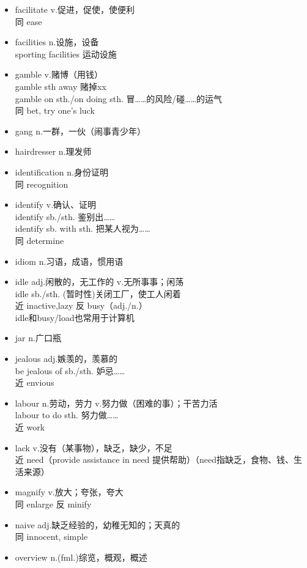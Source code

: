 \documentclass[11pt,a4paper,UTF8,titlepage]{ctexrep} %
\begin{document}
\begin{multicols}{2}
\begin{itemize}
        \item facilitate v.促进，促使，使便利\\同 ease
        \item facilities n.设施，设备\\sporting facilities 运动设施
        \item gamble v.赌博（用钱）\\gamble sth away 赌掉xx\\gamble on sth./on doing sth. 冒……的风险/碰……的运气\\同 bet, try one's luck
        \item gang n.一群，一伙（闹事青少年）
        \item hairdresser n.理发师
        \item identification n.身份证明\\同 recognition
        \item identify v.确认、证明\\identify sb./sth. 鉴别出……\\identify sb. with sth. 把某人视为……\\同 determine
        \item idiom n.习语，成语，惯用语
        \item idle adj.闲散的，无工作的 v.无所事事；闲荡\\idle sb./sth. (暂时性)关闭工厂，使工人闲着\\近 inactive,lazy 反 busy（adj./n.）\\idle和busy/load也常用于计算机
        \item jar n.广口瓶
        \item jealous adj.嫉羡的，羡慕的\\be jealous of sb./sth. 妒忌……\\近 envious
        \item labour n.劳动，劳力 v.努力做（困难的事）；干苦力活\\labour to do sth. 努力做……\\近 work
        \item lack v.没有（某事物），缺乏，缺少，不足\\近 need（provide assistance in need 提供帮助）（need指缺乏，食物、钱、生活来源）
        \item magnify v.放大；夸张，夸大\\同 enlarge 反 minify
        \item naive adj.缺乏经验的，幼稚无知的；天真的\\同 innocent, simple
        \item overview n.(fml.)综览，概观，概述

\end{itemize}
\end{multicols}
\end{document}
